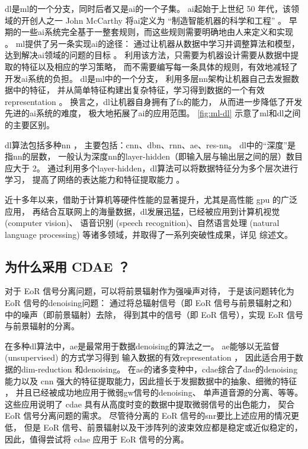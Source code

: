 \ac{dl}是\ac{ml}的一个分支，同时后者又是\ac{ai}的一个子集。
\ac{ai}起始于上世纪 50 年代，该领域的开创人之一 John McCarthy 将\ac{ai}定义为
\enquote{制造智能机器的科学和工程} \cite{mcCarthy2007}。
早期的一些\ac{ai}系统完全基于一整套规则，而这些规则需要明确地由人来定义和实现
\cite{haugeland1985,jackson1998}。
\ac{ml}提供了另一条实现\ac{ai}的途径：
通过让机器从数据中学习并调整算法和模型，达到解决\ac{ai}领域的问题的目标
\cite{samuel1959,mitchell1997}。
利用该方法，只需要为机器设计需要从数据中提取的特征以及相应的学习策略，
而不需要编写每一条具体的规则，有效地减轻了开发\ac{ai}系统的负担。
\ac{dl}是\ac{ml}中的一个分支，
利用多层\ac{nn}架构让机器自己去发掘数据中的特征，
并从简单特征构建出复杂特征，学习得到数据的一个有效\ac{representation}
\cite{bengio2013rl,schmidhuber2015,goodfellow2016}。
换言之，\ac{dl}让机器自身拥有了\ac{fx}的能力，
从而进一步降低了开发先进的\ac{ai}系统的难度，
极大地拓展了\ac{ai}的应用范围。
\autoref{fig:ml-dl} 示意了\ac{ml}和\ac{dl}之间的主要区别。

\ac{dl}算法包括多种\ac{nn} \cite{bengio2009,leCun2015,schmidhuber2015}，
主要包括：\ac{cnn}、\ac{dbn}、\ac{rnn}、\ac{ae}、\ac{res-nn}。
\ac{dl}中的\enquote{深度}是指\ac{nn}的层数，
一般认为深度\ac{nn}的\acs{layer-hidden}（即输入层与输出层之间的层）数目应大于 2。
通过利用多个\ac{layer-hidden}，\ac{dl}算法可以将数据特征分为多个层次进行学习，
提高了网络的表达能力和特征提取能力 \cite{bengio2013rl}。

近十多年以来，借助于计算机等硬件性能的显著提升，尤其是高性能 \ac{gpu} 的广泛应用，
再结合互联网上的海量数据，\ac{dl}发展迅猛，已经被应用到计算机视觉 (computer vision)、
语音识别 (speech recognition)、自然语言处理 (natural language processing)
等诸多领域，并取得了一系列突破性成果，详见  综述文。

\subsection{为什么采用 CDAE ？}

对于 EoR 信号分离问题，可以将前景辐射作为强噪声对待，
于是该问题转化为 EoR 信号的\ac{denoising}问题：
通过将总辐射信号（即 EoR 信号与前景辐射之和）中的噪声（即前景辐射）去除，
得到其中的信号（即 EoR 信号），实现 EoR 信号与前景辐射的分离。

在多种\ac{dl}算法中，\ac{ae}是最常用于数据\ac{denoising}的算法之一。
\ac{ae}能够以无监督 (unsupervised) 的方式学习得到
输入数据的有效\ac{representation} \cite{bourlard1988}，
因此适合用于数据的\ac{dim-reduction}\cite{hinton2006,wang2014}
和\ac{denoising}\cite{xie2012,lu2013,bengio2013}。
在\ac{ae}的诸多变种中，\ac{cdae}综合了\ac{dae}的\ac{denoising}能力以及
\ac{cnn} 强大的特征提取能力，因此擅长于发掘数据中的抽象、细微的特征 \cite{du2017}，
并且已经被成功地应用于微弱\ac{gw}信号的\ac{denoising}\cite{shen2017}、
单声道音源的分离\cite{grais2017}、等等。
这些应用说明了 \ac{cdae} 具有从高度时变的数据中提取微弱信号的出色能力，
契合 EoR 信号分离问题的需求。
尽管待分离的 EoR 信号的\ac{snr}要比上述应用的情况更低，
但是 EoR 信号、前景辐射以及干涉阵列的波束效应都是稳定或近似稳定的，
因此，值得尝试将 \ac{cdae} 应用于 EoR 信号的分离。

